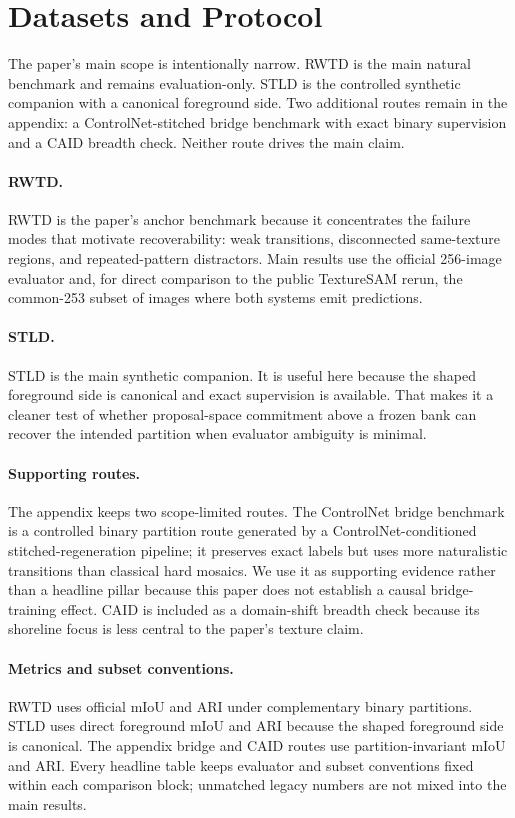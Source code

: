 \section{Datasets and Protocol}
\label{sec:data}

The paper's main scope is intentionally narrow. RWTD is the main natural benchmark and remains evaluation-only. STLD is the controlled synthetic companion with a canonical foreground side. Two additional routes remain in the appendix: a ControlNet-stitched bridge benchmark with exact binary supervision and a CAID breadth check. Neither route drives the main claim.

\paragraph{RWTD.} RWTD is the paper's anchor benchmark because it concentrates the failure modes that motivate recoverability: weak transitions, disconnected same-texture regions, and repeated-pattern distractors. Main results use the official 256-image evaluator and, for direct comparison to the public TextureSAM rerun, the common-253 subset of images where both systems emit predictions.

\paragraph{STLD.} STLD is the main synthetic companion. It is useful here because the shaped foreground side is canonical and exact supervision is available. That makes it a cleaner test of whether proposal-space commitment above a frozen bank can recover the intended partition when evaluator ambiguity is minimal.

\paragraph{Supporting routes.} The appendix keeps two scope-limited routes. The ControlNet bridge benchmark is a controlled binary partition route generated by a ControlNet-conditioned stitched-regeneration pipeline; it preserves exact labels but uses more naturalistic transitions than classical hard mosaics. We use it as supporting evidence rather than a headline pillar because this paper does not establish a causal bridge-training effect. CAID is included as a domain-shift breadth check because its shoreline focus is less central to the paper's texture claim.

\paragraph{Metrics and subset conventions.} RWTD uses official mIoU and ARI under complementary binary partitions. STLD uses direct foreground mIoU and ARI because the shaped foreground side is canonical. The appendix bridge and CAID routes use partition-invariant mIoU and ARI. Every headline table keeps evaluator and subset conventions fixed within each comparison block; unmatched legacy numbers are not mixed into the main results.
